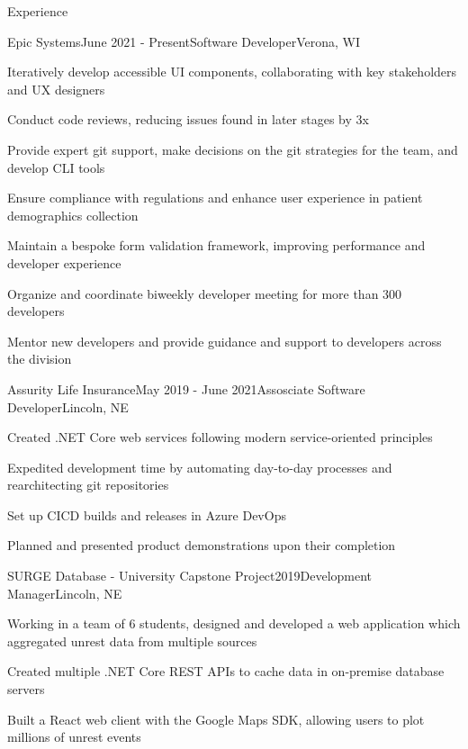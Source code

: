 \documentclass[
	11pt, %
]{article} %
\begin{document}
\begin{rSection}{Experience}

	\begin{rSubsection}{Epic Systems}{June 2021 - Present}{Software Developer}{Verona, WI}
		\item Iteratively develop accessible UI components, collaborating with key stakeholders and UX designers
		\item Conduct code reviews, reducing issues found in later stages by 3x
		\item Provide expert git support, make decisions on the git strategies for the team, and develop CLI tools
		\item Ensure compliance with regulations and enhance user experience in patient demographics collection
		\item Maintain a bespoke form validation framework, improving performance and developer experience
		\item Organize and coordinate biweekly developer meeting for more than 300 developers
		\item Mentor new developers and provide guidance and support to developers across the division
	\end{rSubsection}

	\begin{rSubsection}{Assurity Life Insurance}{May 2019 - June 2021}{Assosciate Software Developer}{Lincoln, NE}
		\item Created .NET Core web services following modern service-oriented principles
		\item Expedited development time by automating day-to-day processes and rearchitecting git repositories
		\item Set up CICD builds and releases in Azure DevOps
		\item Planned and presented product demonstrations upon their completion
	\end{rSubsection}

	\begin{rSubsection}{SURGE Database - University Capstone Project}{2019}{Development Manager}{Lincoln, NE}
		\item Working in a team of 6 students, designed and developed a web application which aggregated unrest data from multiple sources
		\item Created multiple .NET Core REST APIs to cache data in on-premise database servers
		\item Built a React web client with the Google Maps SDK, allowing users to plot millions of unrest events
	\end{rSubsection}

\end{rSection}
\end{document}
